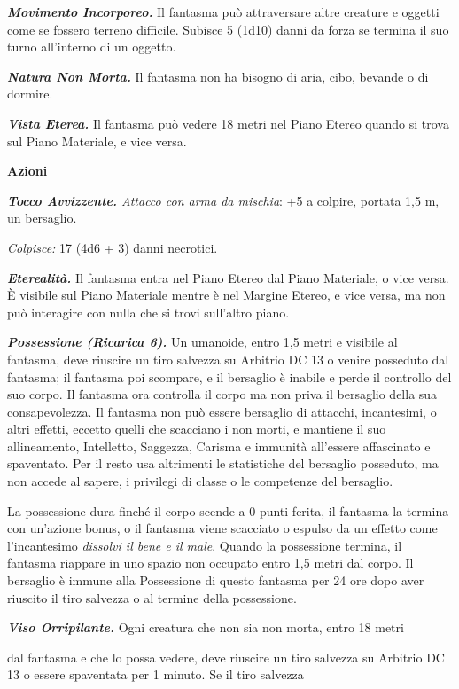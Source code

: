 \begin{multicols}{2}
\emph{\textbf{Movimento Incorporeo.}} Il fantasma può attraversare altre
creature e oggetti come se fossero terreno difficile. Subisce 5 (1d10)
danni da forza se termina il suo turno all'interno di un oggetto.

\emph{\textbf{Natura Non Morta.}} Il fantasma non ha bisogno di aria,
cibo, bevande o di dormire.

\emph{\textbf{Vista Eterea.}} Il fantasma può vedere 18 metri nel Piano
Etereo quando si trova sul Piano Materiale, e vice versa.

\textbf{Azioni}

\emph{\textbf{Tocco Avvizzente.} Attacco con arma da mischia}: +5 a
colpire, portata 1,5 m, un bersaglio.

\emph{Colpisce:} 17 (4d6 + 3) danni necrotici.

\emph{\textbf{Eterealità.}} Il fantasma entra nel Piano Etereo dal Piano
Materiale, o vice versa. È visibile sul Piano Materiale mentre è nel
Margine Etereo, e vice versa, ma non può interagire con nulla che si
trovi sull'altro piano.

\emph{\textbf{Possessione (Ricarica 6).}} Un umanoide, entro 1,5 metri e
visibile al fantasma, deve riuscire un tiro salvezza su Arbitrio DC 13 o
venire posseduto dal fantasma; il fantasma poi scompare, e il bersaglio
è inabile e perde il controllo del suo corpo. Il fantasma ora controlla
il corpo ma non priva il bersaglio della sua consapevolezza. Il fantasma
non può essere bersaglio di attacchi, incantesimi, o altri effetti,
eccetto quelli che scacciano i non morti, e mantiene il suo
allineamento, Intelletto, Saggezza, Carisma e immunità all'essere
affascinato e spaventato. Per il resto usa altrimenti le statistiche del
bersaglio posseduto, ma non accede al sapere, i privilegi di classe o le
competenze del bersaglio.

La possessione dura finché il corpo scende a 0 punti ferita, il fantasma
la termina con un'azione bonus, o il fantasma viene scacciato o espulso
da un effetto come l'incantesimo \emph{dissolvi il bene e il male}.
Quando la possessione termina, il fantasma riappare in uno spazio non
occupato entro 1,5 metri dal corpo. Il bersaglio è immune alla
Possessione di questo fantasma per 24 ore dopo aver riuscito il tiro
salvezza o al termine della possessione.

\emph{\textbf{Viso Orripilante.}} Ogni creatura che non sia non morta,
entro 18 metri

dal fantasma e che lo possa vedere, deve riuscire un tiro salvezza su Arbitrio DC 13 o essere spaventata per 1 minuto. Se il tiro salvezza


\end{multicols}
